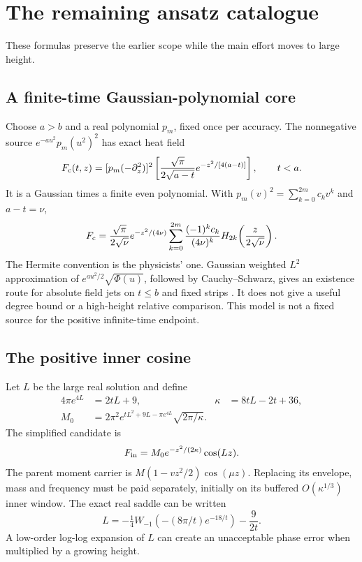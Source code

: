\documentclass[11pt]{article}
\numberwithin{equation}{section}
\begin{document}
\section{The remaining ansatz catalogue}
\label{app:catalogue}
These formulas preserve the earlier scope while the main effort moves
to large height.

\subsection{A finite-time Gaussian-polynomial core}
Choose \(a>b\) and a real polynomial \(p_m\), fixed once per accuracy.
The nonnegative source \(e^{-au^2}p_m(u^2)^2\) has exact heat field
\begin{equation}
F_{\rm c}(t,z)=[p_m(-\partial_z^2)]^2
 \left[\frac{\sqrt\pi}{2\sqrt{a-t}}e^{-z^2/[4(a-t)]}\right],
 \qquad t<a.                                      \label{eq:core}
\end{equation}
It is a Gaussian times a finite even polynomial. With
\(p_m(v)^2=\sum_{k=0}^{2m}c_kv^k\) and \(a-t=\nu\),
\[
F_{\rm c}=\frac{\sqrt\pi}{2\sqrt\nu}e^{-z^2/(4\nu)}
 \sum_{k=0}^{2m}\frac{(-1)^kc_k}{(4\nu)^k}
 H_{2k}\!\left(\frac z{2\sqrt\nu}\right).
\]
The Hermite convention is the physicists' one.
Gaussian weighted \(L^2\) approximation of
\(e^{au^2/2}\sqrt{\Phi(u)}\), followed by Cauchy--Schwarz, gives
an existence route for absolute field jets on \(t\le b\) and fixed
strips \cite{ansatz01,dlmf-Hermite}. It does not give a useful degree
bound or a high-height relative comparison. This model is not a fixed
source for the positive infinite-time endpoint.

\subsection{The positive inner cosine}
Let \(L\) be the large real solution and define
\begin{align}
4\pi e^{4L}&=2tL+9,&\kappa&=8tL-2t+36,\\
M_0&=2\pi^2e^{tL^2+9L-\pi e^{4L}}\sqrt{2\pi/\kappa}.
\end{align}
The simplified candidate is
\[
F_{\rm in}=M_0e^{-z^2/(2\kappa)}\cos(Lz).
\]
The parent moment carrier is \(M(1-vz^2/2)\cos(\mu z)\).
Replacing its envelope, mass and frequency must be paid separately,
initially on its buffered \(O(\kappa^{1/3})\) inner window.
The exact real saddle can be written
\[
L=-\tfrac14W_{-1}(-(8\pi/t)e^{-18/t})-\frac9{2t}.
\]
A low-order log-log expansion of \(L\) can create an unacceptable
phase error when multiplied by a growing height.
\end{document}
